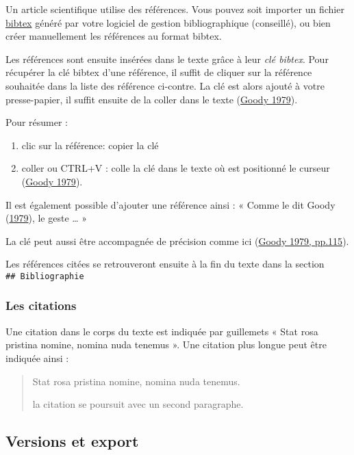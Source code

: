\documentclass[12pt,french,letterpaper]{article}
\providecommand{\tightlist}{%
  \setlength{\itemsep}{0pt}\setlength{\parskip}{0pt}}
\begin{document}
Un article scientifique utilise des références. Vous pouvez soit
importer un fichier
\href{http://www.bib.umontreal.ca/lgb/BibTeX/default.htm}{bibtex} généré
par votre logiciel de gestion bibliographique (conseillé), ou bien créer
manuellement les références au format bibtex.

Les références sont ensuite insérées dans le texte grâce à leur
\emph{clé bibtex}. Pour récupérer la clé bibtex d'une référence, il
suffit de cliquer sur la référence souhaitée dans la liste des référence
ci-contre. La clé est alors ajouté à votre presse-papier, il suffit
ensuite de la coller dans le texte
(\protect\hyperlink{ref-goody_raison_1979}{Goody 1979}).

Pour résumer :

\begin{enumerate}
\def\labelenumi{\arabic{enumi}.}
\tightlist
\item
  clic sur la référence: copier la clé
\item
  coller ou CTRL+V : colle la clé dans le texte où est positionné le
  curseur (\protect\hyperlink{ref-goody_raison_1979}{Goody 1979}).
\end{enumerate}

Il est également possible d'ajouter une référence ainsi : « Comme le dit
Goody (\protect\hyperlink{ref-goody_raison_1979}{1979}), le geste
\ldots{} »

La clé peut aussi être accompagnée de précision comme ici
(\protect\hyperlink{ref-goody_raison_1979}{Goody 1979, pp.115}).

Les références citées se retrouveront ensuite à la fin du texte dans la
section \texttt{\#\#\ Bibliographie}

\hypertarget{les-citations}{%
\subsubsection{Les citations}\label{les-citations}}

Une citation dans le corps du texte est indiquée par guillemets « Stat
rosa pristina nomine, nomina nuda tenemus ». Une citation plus longue
peut être indiquée ainsi :

\begin{quote}
Stat rosa pristina nomine, nomina nuda tenemus.

la citation se poursuit avec un second paragraphe.
\end{quote}

\hypertarget{versions-et-export}{%
\subsection{Versions et export}\label{versions-et-export}}
\end{document}
